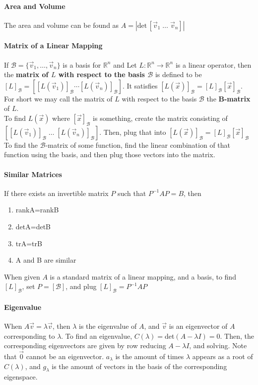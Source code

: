 \documentclass[10pt,letter]{article}
\begin{document}
\paragraph{Area and Volume} The area and volume can be found as $A=\left|\text{det}\,[\vec{v}_1\;\ldots\;\vec{v}_n]\right|$ 

\paragraph{Matrix of a Linear Mapping}  If $\mathcal{B}=\{\vec{v}_1,\ldots,\vec{v}_n\}$ is a basis for $\mathbb{R}^n$ and Let $L:\mathbb{R}^n\rightarrow\mathbb{R}^n$ is a linear operator, then the \textbf{matrix of $L$ with respect to the basis $\mathcal{B}$} is defined to be $[L]_\mathcal{B}=\left[[L(\vec{v}_1)]_\mathcal{B}\cdots[L(\vec{v}_n)]_\mathcal{B}\right]$. It satisfies $[L(\vec{x})]_\mathcal{B}=[L]_\mathcal{B}[\vec{x}]_\mathcal{B}$. For short we may call the matrix of $L$ with respect to the basis $\mathcal{B}$ the \textbf{B-matrix} of $L$. \\ 
To find $L(\vec{x})$ where $[\vec{x}]_\mathcal{B}$ is something, create the matrix consisting of $[[L(\vec{v}_1)]_\mathcal{B}\;\ldots\;[L(\vec{v}_n)]_\mathcal{B}]$. Then, plug that into $[L(\vec{x})]_\mathcal{B}=[L]_\mathcal{B}[\vec{x}]_\mathcal{B}$ \\ 
To find the $\mathcal{B}$-matrix of some function, find the linear combination of that function using the basis, and then plug those vectors into the matrix. 

\paragraph{Similar Matrices} If there exists an invertible matrix $P$ such that $P^{-1}AP=B$, then \begin{enumerate}
    \item rankA=rankB 
    \item detA=detB
    \item trA=trB
    \item A and B are similar 
\end{enumerate}
When given $A$ is a standard matrix of a linear mapping, and a basis, to find $[L]_\mathcal{B}$, set $P=[\mathcal{B}]$, and plug $[L]_\mathcal{B}=P^{-1}AP$ 

\paragraph{Eigenvalue} When $A\vec{v}=\lambda\vec{v}$, then $\lambda$ is the eigenvalue of $A$, and $\vec{v}$ is an eigenvector of $A$ corresponding to $\lambda$. To find an eigenvalue, $C(\lambda)=$det$(A-\lambda I)=0$. Then, the corresponding eigenvectors are given by row reducing $A-\lambda I$, and solving. Note that $\vec{0}$ cannot be an eigenvector. $a_\lambda$ is the amount of times $\lambda$ appears as a root of $C(\lambda)$, and $g_\lambda$ is the amount of vectors in the basis of the corresponding eigenspace. 
\end{document}
